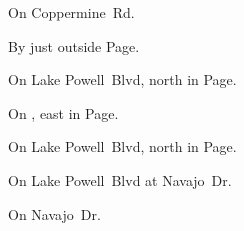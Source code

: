 
\begin{LocationList}

On Coppermine~Rd.

By  just outside Page.

On Lake Powell~Blvd, north in Page.

\Location{\TruckService \Service \Rest}
On , east in Page.

\Location{\TruckStop \Gas \Rest}
On Lake Powell~Blvd, north in Page.

On Lake Powell~Blvd at  Navajo~Dr.

On  Navajo~Dr.

\end{LocationList}
